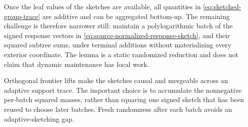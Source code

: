 Once the leaf values of the sketches are available, all quantities in
\cref{eq:sketched-group-trace} are additive and can be aggregated bottom-up.
The remaining challenge is therefore narrower still: maintain a polylogarithmic
batch of the signed response vectors in
\cref{eq:source-normalized-response-sketch}, and their squared subtree sums,
under terminal additions without materializing every exterior coordinate.
The lemma is a static randomized reduction and does not claim that dynamic
maintenance has local work.

Orthogonal frontier lifts make the sketches causal and mergeable across an
adaptive support trace.  The important choice is to accumulate the
nonnegative per-batch squared masses, rather than squaring one signed sketch
that has been reused to choose later batches.  Fresh randomness after each
batch avoids an adaptive-sketching gap.

